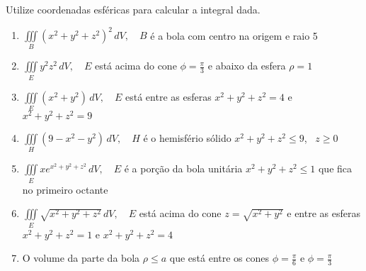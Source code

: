 



	
	
	\vspace{5mm}
	
	Utilize coordenadas esféricas para calcular a integral dada.
	
	\begin{enumerate}
		
		\item $\displaystyle \iiint \limits_{B} (x^2 + y^2 + z^2)^2 \, dV, \quad B$ é a bola com centro na origem e raio 5
		
		\item $\displaystyle \iiint \limits_{E} y^{2}z^{2} \, dV, \quad E$ está acima do cone $\phi = \frac{\pi}{3}$ e abaixo da esfera $\rho = 1$
		
		\item $\displaystyle \iiint \limits_{E} (x^2 + y ^2) \, dV, \quad E$ está entre as esferas $x^2 + y^2 + z^2 = 4$ e $x^2 + y^2 + z^2 = 9$
		
		\item $\displaystyle \iiint \limits_{H} (9 - x^2 - y ^2) \, dV, \quad H$ é o hemisfério sólido $x^2 + y^2 + z^2 \leq 9$, \, $z \geq 0$
		
		\item $\displaystyle \iiint \limits_{E} xe^{x^2 + y^2 + z^2} \, dV, \quad E$ é a porção da bola unitária $x^2 + y^2 + z^2 \leq 1$ que fica no primeiro octante
		
		\item $\displaystyle \iiint \limits_{E} \sqrt{x^2 + y^2 + z^2} \, dV, \quad E$ está acima do cone $z = \sqrt{x^2 + y^2}$ e entre as esferas $x^2 + y^2 + z^2 = 1$ e $x^2 + y^2 + z^2 = 4$
		
		\item O volume da parte da bola $\rho \leq a$ que está entre os cones $\phi = \frac{\pi}{6}$ e $\phi = \frac{\pi}{3}$

	\end{enumerate}
	
	\vspace{5mm}	
	
